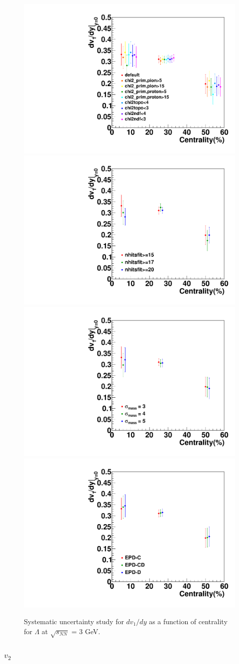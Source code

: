 \begin{figure}[h]
\includegraphics[width=0.49\linewidth]{chapterX/fig/ld_sys_cut_vn.pdf}
\includegraphics[width=0.49\linewidth]{chapterX/fig/ld_sys_cut_vn_nhits.pdf}
\includegraphics[width=0.49\linewidth]{FXT3gev/chapterX/fig/ld_sys_cut_vn_msigma.pdf}
\includegraphics[width=0.49\linewidth]{FXT3gev/chapterX/fig/ld_sys_cut_vn_epdres.pdf}
\caption{Systematic uncertainty study for $dv_{1}/dy$ as a function of centrality for $\Lambda$ at $\sqrt{s_{NN}}$ = 3 GeV.}
\label{lambda_dv1dy_sys}
\end{figure}



\subsubsection{$v_2$}


